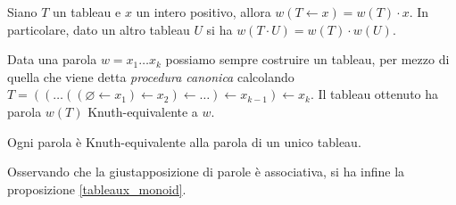 \begin{prop}\label{word_bump_equiv}
Siano $T$ un tableau e $x$ un intero positivo, allora $w(T \gets x) = w(T)
\cdot x$. In particolare, dato un altro tableau $U$ si ha $w(T\cdot U)
= w(T) \cdot w(U)$.
\end{prop}

Data una parola $w = x_1 \ldots x_k$ possiamo sempre costruire un
tableau, per mezzo di quella che viene detta \emph{procedura canonica}
calcolando $T = (( \ldots ((\varnothing \gets x_1) \gets x_2 ) \gets \ldots ) \gets x_{k-1} )
\gets x_k$. Il tableau ottenuto ha parola $w(T)$ Knuth-equivalente a
$w$.

\begin{teo}\label{knuth_equiv_word}
Ogni parola \`e Knuth-equivalente alla parola di un unico tableau.
\end{teo}

Osservando che la giustapposizione di parole \`e associativa, si ha
infine la proposizione \ref{tableaux_monoid}.
